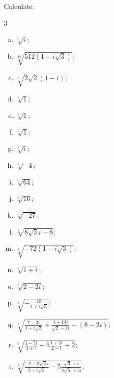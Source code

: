 \begin{problem}
Calculate:
\begin{multicols}{3}
\begin{enumerate}[a)]
\item $\sqrt[6]{i}$;
\item $\sqrt[10]{512(1-i \sqrt{3})}$;
\item $\sqrt[8]{2 \sqrt{2}(1-i)}$;
\item $\sqrt[3]{1}$;
\item $\sqrt[4]{1}$;
\item $\sqrt[6]{1}$;
\item $\sqrt[3]{i}$;
\item $\sqrt[4]{-4}$;
\item $\sqrt[6]{64}$;
\item $\sqrt[8]{16}$;
\item $\sqrt[6]{-27}$;
\item $\sqrt[4]{8 \sqrt{3} i-8}$;
\item $\sqrt[4]{-72(1-i \sqrt{3})}$;
\item $\sqrt[3]{1+i}$;
\item $\sqrt[3]{2-2 i}$;
\item $\sqrt[4]{-\frac{18}{1+i \sqrt{3}}}$;
\item $\sqrt[4]{\frac{7-2 i}{1+i \sqrt{2}}+\frac{4+14 i}{\sqrt{2}+2 i}-(8-2 i)}$;
\item $\sqrt[3]{\frac{1-5 i}{1+i}-5 \frac{1+2 i}{2-i}+2}$;
\item $\sqrt[4]{\frac{-2+2 \sqrt{3} i}{2+i \sqrt{5}}-5 \frac{\sqrt{3}+i}{2 \sqrt{5}+5 i}}$.
\end{enumerate}
\end{multicols}
\end{problem}

